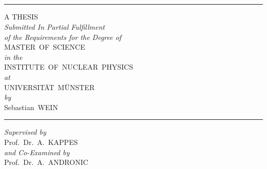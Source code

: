 \documentclass[12pt,a4paper,titlepage]{report}
\begin{document}
	
	\begin{titlepage}
		\begin{center}
			
			{\Huge\emph{}} \\ 
			\vspace{4pt}
			{\Huge{}} \\
			\vspace{4pt}
			{\huge{}} \\
			\vspace{4pt}
			{\huge{}} \\
			\vspace{4pt}
			{\LARGE{}} 
			
			\vspace{\fill}
			{\rule{0.5\textwidth}{0.5pt}}
			\vspace{\fill}
			
			{\huge\MakeUppercase{A Thesis}} \\
			\vspace{14.4pt}
			{\Large\emph{Submitted In Partial Fulfillment \\
					of the Requirements for the Degree of}} \\
			\vspace{2pt}
			{\LARGE\MakeUppercase{Master~of~Science}} \\
			\vspace{14.4pt}
			{\Large\emph{in the}} \\
			\vspace{2pt}
			{\Large\MakeUppercase{Institute~of~Nuclear~Physics}} \\
			\vspace{14.4pt}
			{\Large\emph{at}} \\
			\vspace{2pt}
			{\LARGE\MakeUppercase{Universität~Münster}} \\
			\vspace{14.4pt}
			{\Large\emph{by}} \\
			\vspace{2pt}
			{\LARGE Sebastian~\MakeUppercase{Wein}} 
			
			\vspace{\fill}
			{\rule{0.5\textwidth}{0.5pt}}
			\vspace{\fill}
			
			{\Large\emph{Supervised by}} \\
			\vspace{1pt}
			{\Large Prof.~Dr.~A.~\MakeUppercase{Kappes}} \\
			\vspace{1pt}
			{\Large\emph{and Co-Examined by}} \\ 
			\vspace{1pt}
			{\Large Prof.~Dr.~A.~\MakeUppercase{Andronic}} \\
			

\end{center}
\end{titlepage}
\end{document}
